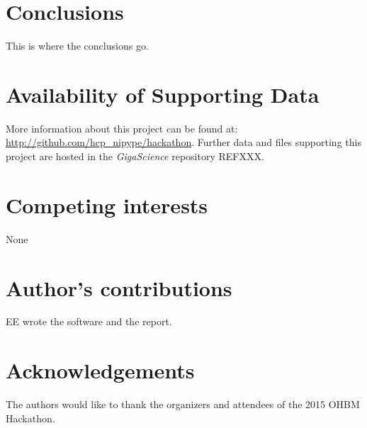 \documentclass[twocolumn]{bmcart}%
\begin{document}
\section{Conclusions}\label{conclusions}

This is where the conclusions go.


\begin{backmatter}

\section*{Availability of Supporting Data}
More information about this project can be found at: \url{http://github.com/hcp\_nipype/hackathon}. Further data and files supporting this project are hosted in the \emph{GigaScience} repository REFXXX.

\section*{Competing interests}
None

\section*{Author's contributions}
EE wrote the software and the report.

\section*{Acknowledgements}
The authors would like to thank the organizers and attendees of the 2015
OHBM Hackathon.

  
  


\end{backmatter}
\end{document}
